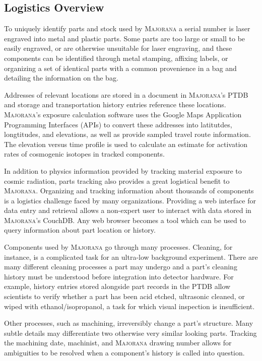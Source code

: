 \documentclass[journal]{IEEEtran}
\begin{document}
\subsection{Logistics Overview}

To uniquely identify parts and stock used by \textsc{Majorana} a serial number is laser engraved into metal and plastic parts.
Some parts are too large or small to be easily engraved, or are otherwise unsuitable for laser engraving, and these
components can be identified through metal stamping, affixing labels, or organizing a set of identical parts
with a common provenience in a bag and detailing the information on the bag.

Addresses of relevant locations are stored in a document in \textsc{Majorana}'s PTDB and storage and transportation history
entries reference these locations. \textsc{Majorana}'s exposure calculation software uses the 
Google Maps Application Programming Interfaces (APIs) to convert these addresses into latitutdes, longtitudes, and elevations,
as well as provide sampled travel route information. The elevation versus time
profile is used to calculate an estimate for activation rates of cosmogenic isotopes in tracked components.

In addition to physics information provided by tracking material exposure to cosmic radiation, parts tracking also provides
a great logistical benefit to \textsc{Majorana}. Organizing and tracking information about thousands of components is a logistics
challenge faced by many organizations. Providing a web interface for data entry and retrieval allows
a non-expert user to interact with data stored in \textsc{Majorana}'s CouchDB. Any web browser becomes a tool which can
be used to query information about part location or history.

Components used by \textsc{Majorana} go through many processes. Cleaning, for instance, is a complicated task for an ultra-low
background experiment. There are many different cleaning processes a part may undergo and a part's cleaning history
must be understood before integration into detector hardware. For example, history entries stored alongside part records in the PTDB
allow scientists to verify whether a part has been acid etched, ultrasonic cleaned, or wiped with ethanol/isopropanol,
a task for which visual inspection is insufficient.

Other processes, such as machining, irreversibly change a part's structure. Many subtle details may differentiate
two otherwise very similar looking parts. Tracking the machining date, machinist, and \textsc{Majorana} drawing number allows
for ambiguities to be resolved when a component's history is called into question. 
\end{document}
